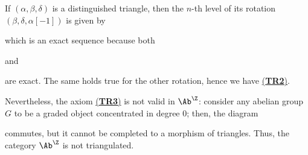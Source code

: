 \begin{ex}
    If $(\alpha,\beta, \delta)$ is a distinguished triangle,
    then the $n$-th level of
    its rotation $(\beta, \delta, \alpha[-1])$ is given by
    \begin{center}
    \end{center}
    which is an exact sequence because both
    \begin{center}
    \end{center}
    and
    \begin{center}
    \end{center}
    are exact. The same holds true for the other rotation,
    hence we have \hyperref[TR2]{(\textbf{TR2})}. 
    
    Nevertheless, the axiom \hyperref[TR3]{(\textbf{TR3})}
    is not valid in $\Ab^{\Z}$: consider any abelian group $G$
    to be a graded object concentrated in degree 0; then,
    the diagram
    \begin{center}
    \end{center}
    commutes, but it cannot be completed to a morphism of triangles.
    Thus, the category $\Ab^{\Z}$ is not triangulated.
\end{ex}

